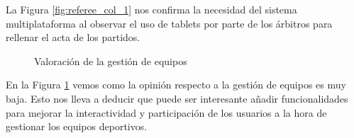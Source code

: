 La Figura \ref{fig:referee_col_1} nos confirma la necesidad del sistema multiplataforma al observar el uso de tablets por parte de los árbitros para rellenar el acta de los partidos.

\begin{figure}[htbp]
	\centering
	\caption{Valoración de la gestión de equipos}
	\label{fig:captain_col}
\end{figure}

En la Figura \ref{fig:captain_col} vemos como la opinión respecto a la gestión de equipos es muy baja. Esto nos lleva a deducir que puede ser interesante añadir funcionalidades para mejorar la interactividad y participación de los usuarios a la hora de gestionar los equipos deportivos.